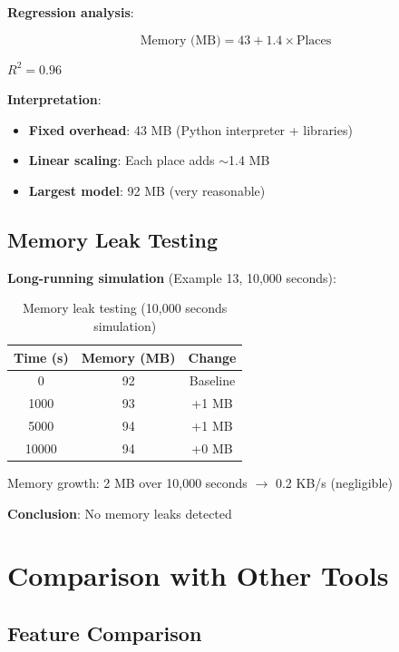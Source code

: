 \textbf{Regression analysis}:

\begin{equation}
\text{Memory (MB)} = 43 + 1.4 \times \text{Places}
\end{equation}

$R^2 = 0.96$

\textbf{Interpretation}:

\begin{itemize}
    \item \textbf{Fixed overhead}: 43 MB (Python interpreter + libraries)
    \item \textbf{Linear scaling}: Each place adds $\sim$1.4 MB
    \item \textbf{Largest model}: 92 MB (very reasonable)
\end{itemize}

\subsection{Memory Leak Testing}
\label{subsec:memory-leak-testing}

\textbf{Long-running simulation} (Example 13, 10,000 seconds):

\begin{table}[h]
\centering
\begin{tabular}{@{}ccc@{}}
\toprule
\textbf{Time (s)} & \textbf{Memory (MB)} & \textbf{Change} \\
\midrule
0 & 92 & Baseline \\
1000 & 93 & +1 MB \\
5000 & 94 & +1 MB \\
10000 & 94 & +0 MB \\
\bottomrule
\end{tabular}
\caption{Memory leak testing (10,000 seconds simulation)}
\label{tab:memory-leak}
\end{table}

Memory growth: 2 MB over 10,000 seconds $\to$ 0.2 KB/s (negligible)

\textbf{Conclusion}: No memory leaks detected \checkmark

\section{Comparison with Other Tools}
\label{sec:tool-comparison}

\subsection{Feature Comparison}
\label{subsec:feature-comparison}

